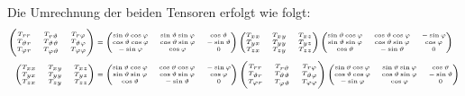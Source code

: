 	Die Umrechnung der beiden Tensoren erfolgt wie folgt:
	\begin{equation}{\tiny\begin{split}
			\begin{pmatrix}
				T_{rr} & T_{r\vartheta} & T_{r\varphi} \\
				T_{\vartheta r} & T_{\vartheta\vartheta} & T_{\vartheta\varphi} \\
				T_{\varphi r} & T_{\varphi\vartheta} & T_{\varphi\varphi} \\
			\end{pmatrix} &=\begin{pmatrix} \sin \vartheta \cos \varphi & \sin \vartheta \sin \varphi & \cos \vartheta \\ \cos \vartheta \cos \varphi & \cos \vartheta \sin \varphi & -\sin \vartheta \\ -\sin \varphi & \cos \varphi & 0 \end{pmatrix} \begin{pmatrix} T_{xx} & T_{xy} & T_{xz} \\ T_{yx} & T_{yy} & T_{yz} \\ T_{zx} & T_{zy} & T_{zz} \end{pmatrix} \begin{pmatrix} \sin \vartheta \cos \varphi & \cos \vartheta \cos \varphi & -\sin \varphi \\ \sin \vartheta \sin \varphi & \cos \vartheta \sin \varphi & \cos \varphi \\ \cos \vartheta & -\sin \vartheta & 0 \end{pmatrix}  \\
			\begin{pmatrix}
				T_{xx} & T_{xy} & T_{xz} \\
				T_{yx} & T_{yy} & T_{yz} \\
				T_{zx} & T_{zy} & T_{zz} \\
			\end{pmatrix} &= \begin{pmatrix} \sin \vartheta \cos \varphi & \cos \vartheta \cos \varphi & -\sin \varphi \\ \sin \vartheta \sin \varphi & \cos \vartheta \sin \varphi & \cos \varphi \\ \cos \vartheta & -\sin \vartheta & 0 \end{pmatrix} \begin{pmatrix} T_{rr} & T_{r\vartheta} & T_{r\varphi} \\ T_{\vartheta r} & T_{\vartheta\vartheta} & T_{\vartheta\varphi} \\ T_{\varphi r} & T_{\varphi\vartheta} & T_{\varphi\varphi} \end{pmatrix} \begin{pmatrix} \sin \vartheta \cos \varphi & \sin \vartheta \sin \varphi & \cos \vartheta \\ \cos \vartheta \cos \varphi & \cos \vartheta \sin \varphi & -\sin \vartheta \\ -\sin \varphi & \cos \varphi & 0 \end{pmatrix}
	\end{split}}\end{equation}
